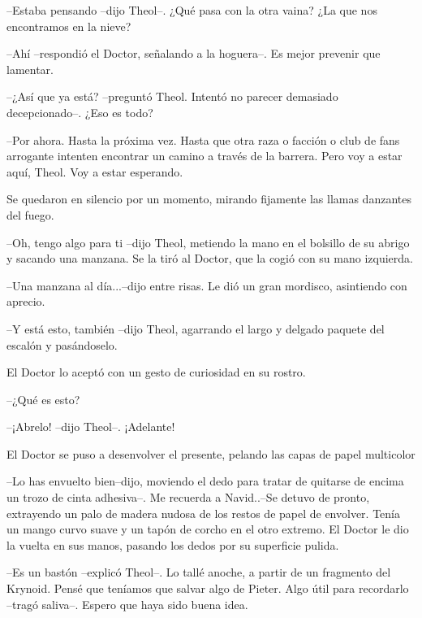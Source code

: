 --Estaba pensando --dijo Theol--. ¿Qué pasa con la otra vaina? ¿La que nos encontramos en la nieve?



--Ahí --respondió el Doctor, señalando a la hoguera--. Es mejor prevenir que lamentar.



--¿Así que ya está? --preguntó Theol. Intentó no parecer demasiado decepcionado--. ¿Eso es todo?



--Por ahora. Hasta la próxima vez. Hasta que otra raza o facción o club de fans arrogante intenten encontrar un camino a través de la barrera. Pero voy a estar aquí, Theol. Voy a estar esperando.



Se quedaron en silencio por un momento, mirando fijamente las llamas danzantes del fuego.



--Oh, tengo algo para ti --dijo Theol, metiendo la mano en el bolsillo de su abrigo y sacando una manzana. Se la tiró al Doctor, que la cogió con su mano izquierda.



--Una manzana al día...--dijo entre risas. Le dió un gran mordisco, asintiendo con aprecio.



--Y está esto, también --dijo Theol, agarrando el largo y delgado paquete del escalón y pasándoselo.



El Doctor lo aceptó con un gesto de curiosidad en su rostro. 

--¿Qué es esto?



--¡Abrelo! --dijo Theol--. ¡Adelante!



El Doctor se puso a desenvolver el presente, pelando las capas de papel multicolor 

--Lo has envuelto bien--dijo, moviendo el dedo para tratar de quitarse de encima un trozo de cinta adhesiva--. Me recuerda a Navid..--Se detuvo de pronto, extrayendo un palo de madera nudosa de los restos de papel de envolver. Tenía un mango curvo suave y un tapón de corcho en el otro extremo. El Doctor le dio la vuelta en sus manos, pasando los dedos por su superficie pulida.



--Es un bastón --explicó Theol--. Lo tallé anoche, a partir de un fragmento del Krynoid. Pensé que teníamos que salvar algo de Pieter. Algo útil para recordarlo --tragó saliva--. Espero que haya sido buena idea.



